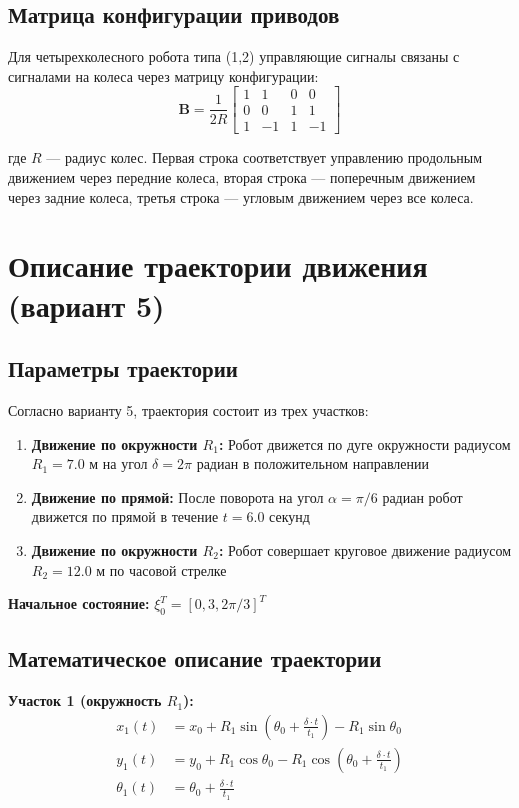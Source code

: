 \subsection{Матрица конфигурации приводов}

Для четырехколесного робота типа (1,2) управляющие сигналы связаны с сигналами на колеса через матрицу конфигурации:
$$\mathbf{B} = \frac{1}{2R}\begin{bmatrix}
1 & 1 & 0 & 0 \\
0 & 0 & 1 & 1 \\
1 & -1 & 1 & -1
\end{bmatrix}$$

где $R$ --- радиус колес. Первая строка соответствует управлению продольным движением через передние колеса, вторая строка --- поперечным движением через задние колеса, третья строка --- угловым движением через все колеса.

\section{Описание траектории движения (вариант 5)}

\subsection{Параметры траектории}

Согласно варианту 5, траектория состоит из трех участков:

\begin{enumerate}
\item \textbf{Движение по окружности $R_1$:} Робот движется по дуге окружности радиусом $R_1 = 7.0$ м на угол $\delta = 2\pi$ радиан в положительном направлении
\item \textbf{Движение по прямой:} После поворота на угол $\alpha = \pi/6$ радиан робот движется по прямой в течение $t = 6.0$ секунд
\item \textbf{Движение по окружности $R_2$:} Робот совершает круговое движение радиусом $R_2 = 12.0$ м по часовой стрелке
\end{enumerate}

\textbf{Начальное состояние:} $\xi_0^T = [0, 3, 2\pi/3]^T$

\subsection{Математическое описание траектории}

\textbf{Участок 1 (окружность $R_1$):}
\begin{align}
x_1(t) &= x_0 + R_1 \sin\left(\theta_0 + \frac{\delta \cdot t}{t_1}\right) - R_1 \sin\theta_0 \\
y_1(t) &= y_0 + R_1 \cos\theta_0 - R_1 \cos\left(\theta_0 + \frac{\delta \cdot t}{t_1}\right) \\
\theta_1(t) &= \theta_0 + \frac{\delta \cdot t}{t_1}
\end{align}

